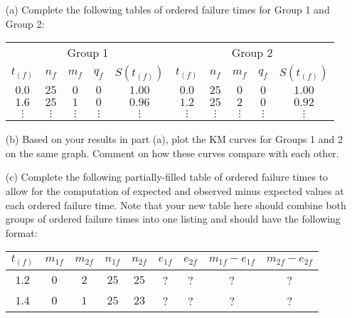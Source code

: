 \documentclass[12pt]{article}
\begin{document}
\begin{itemize}
	\item[(a)] Complete the following tables of ordered failure times for Group 1 and Group 2:
	
\begin{center}
\begin{tabular}{ c c c c c | c c c c c }
 \multicolumn{5}{c}{Group 1} & \multicolumn{5}{c}{Group 2} \\

 $t_{(f)}$ & $n_f$ & $m_{f}$ & $q_{f}$ & $S(t_{(f)})$   & $t_{(f)}$ & $n_f$ & $m_{f}$ & $q_{f}$ & $S(t_{(f)})$ \\

 \hline

 $0.0$ & $25$ & $0$ & $0$ & $1.00$    & $0.0$ & $25$ & $0$ & $0$ & $1.00$ \\

 $1.6$ & $25$ & $1$ & $0$ & $0.96$    & $1.2$ & $25$ & $2$ & $0$ & $0.92$ \\

 $\vdots$ & $\vdots$ & $\vdots$ & $\vdots$ & $\vdots$    & $\vdots$ & $\vdots$ & $\vdots$ & $\vdots$ & $\vdots$
\end{tabular}
\end{center}

	\item[(b)] Based on your results in part (a), plot the KM curves for Groups 1 and 2 on the same graph. Comment on how these curves compare with each other.
	
	\item[(c)] Complete the following partially-filled table of ordered failure times to allow for the computation of expected and observed minus expected values at each ordered failure time. Note that your new table here should combine both groups of ordered failure times into one listing and should have the following format: 
	\begin{center}
\begin{tabular}{ c | c c | c c | c c | c c }

 $t_{(f)}$ & $m_{1f}$ & $m_{2f}$ & $n_{1f}$ & $n_{2f}$   & $e_{1f}$ & $e_{2f}$ & $m_{1f} - e_{1f}$ & $m_{2f} - e_{2f}$ \\

 \hline

 $1.2$ & $0$ & $2$ & $25$ & $25$    & ? & ? & ? & ? \\

 $1.4$ & $0$ & $1$ & $25$ & $23$    & ? & ? & ? & ? \\


\end{tabular}
\end{center}
\end{itemize}
\end{document}
